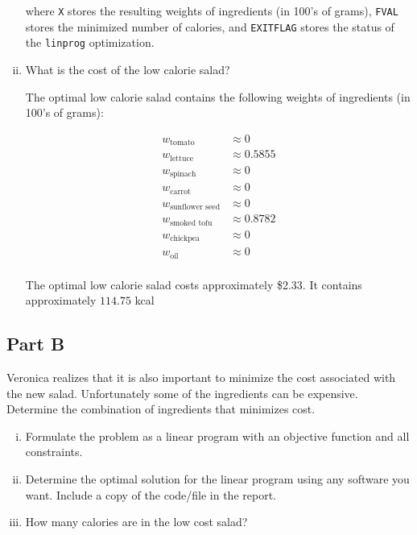 \documentclass[../main.tex]{subfiles}
\begin{document}
\begin{enumerate}[i.]
	

	where \verb|X| stores the resulting weights of ingredients (in 100's of grams), \verb|FVAL| stores the minimized number of calories, and \verb|EXITFLAG| stores the status of the \verb|linprog| optimization.

	\item What is the cost of the low calorie salad?

	The optimal low calorie salad contains the following weights of ingredients (in 100's of grams):

	\begin{equation*}
		\begin{aligned}
			w_{\text{tomato}} &\approx 0 \\
			w_{\text{lettuce}} &\approx 0.5855 \\
			w_{\text{spinach}} &\approx 0 \\
			w_{\text{carrot}} &\approx 0 \\
			w_{\text{sunflower seed}} &\approx 0 \\
			w_{\text{smoked tofu}} &\approx 0.8782 \\
			w_{\text{chickpea}} &\approx 0 \\
			w_{\text{oil}} &\approx 0 \\
		\end{aligned}
	\end{equation*}

	The optimal low calorie salad costs approximately \$2.33. It contains approximately $114.75$ kcal
\end{enumerate}

\subsection*{Part B}
Veronica realizes that it is also important to minimize the cost associated with the new salad. Unfortunately some of the ingredients can be expensive. Determine the combination of ingredients that minimizes cost.

\begin{enumerate}[i.]
	\item Formulate the problem as a linear program with an objective function and all constraints.

	\item Determine the optimal solution for the linear program using any software you want. Include a copy of the code/file in the report.

	\item How many calories are in the low cost salad?
\end{enumerate}
\end{document}
